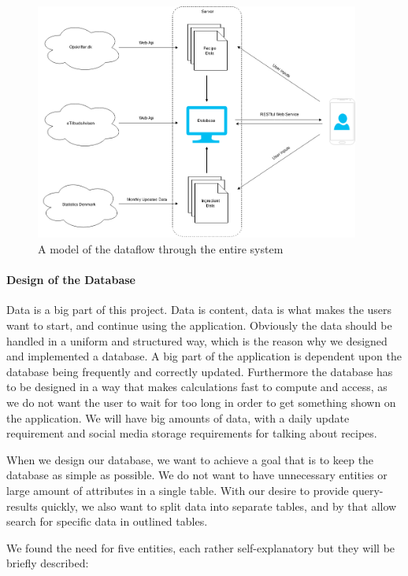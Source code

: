 \begin{figure}
\centering
\includegraphics[width=0.95\textwidth]{Pictures/dataflow}
\caption{A model of the dataflow through the entire system}
\label{fig:backend_dataflow}
\end{figure}

\paragraph{Design of the Database}
\label{para:dbdesign}

Data is a big part of this project. Data is content, data is what makes the users want to start, and continue using the application. Obviously the data should be handled in a uniform and structured way, which is the reason why we designed and implemented a database. A big part of the application is dependent upon the database being frequently and correctly updated. Furthermore the database has to be designed in a way that makes calculations fast to compute and access, as we do not want the user to wait for too long in order to get something shown on the application. We will have big amounts of data, with a daily update requirement and social media storage requirements for talking about recipes.

When we design our database, we want to achieve a goal that is to keep the database as simple as possible. We do not want to have unnecessary entities or large amount of attributes in a single table. With our desire to provide query-results quickly, we also want to split data into separate tables, and by that allow search for specific data in outlined tables. 

We found the need for five entities, each rather self-explanatory but they will be briefly described:

